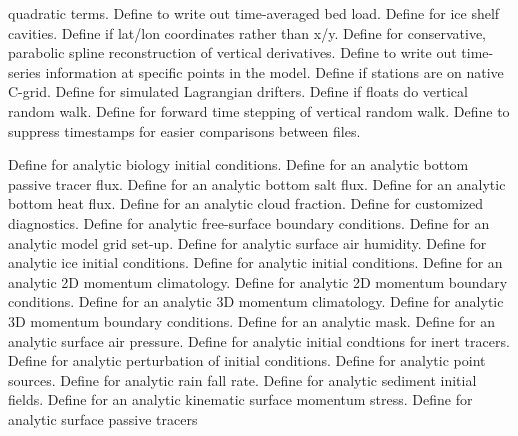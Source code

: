 \begin{klist}
\begin{klist}
  quadratic terms.
        Define to write out time-averaged
  bed load.
        Define for ice shelf cavities.
       Define if lat/lon coordinates rather than x/y.
         Define for conservative, parabolic spline
  reconstruction of vertical derivatives.
        Define to write out time-series
  information at specific points in the model.
        Define if stations are on native C-grid.
        Define for simulated Lagrangian drifters.
      Define if floats do vertical random walk.
     Define for forward time stepping of vertical random
  walk.
      Define to suppress timestamps for easier
    comparisons between files.
  \end{klist}
   \mbox{}
  \begin{klist}
     Define for analytic biology initial conditions.
      Define for an analytic bottom passive tracer flux.
      Define for an analytic bottom salt flux.
      Define for an analytic bottom heat flux.
       Define for an analytic cloud fraction.
        Define for customized diagnostics.
       Define for analytic free-surface boundary
  conditions.
        Define for an analytic model grid set-up.
     Define for analytic surface air humidity.
         Define for analytic ice initial conditions.
     Define for analytic initial conditions.
     Define for an analytic 2D momentum climatology.
       Define for analytic 2D momentum boundary
  conditions.
     Define for an analytic 3D momentum climatology.
       Define for analytic 3D momentum boundary
  conditions.
        Define for an analytic mask.
        Define for an analytic surface air pressure.
     Define for analytic initial condtions for
  inert tracers.
     Define for analytic perturbation of initial
  conditions.
     Define for analytic point sources.
        Define for analytic rain fall rate.
     Define for analytic sediment initial fields.
      Define for an analytic kinematic surface
  momentum stress.
      Define for analytic surface passive tracers

\end{klist}
\end{klist}
